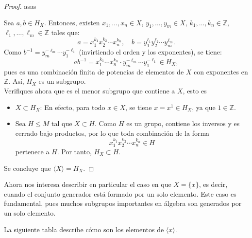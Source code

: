 \begin{proof}
	{\color{white}asas}
	
	\medskip
	\noindent [\(H_X\) es un subgrupo] Sea \( a, b \in H_X \). Entonces, existen \( x_1, \ldots, x_n \in X \), \( y_1, \ldots, y_m \in X \), \( k_1, \ldots, k_n \in \mathbb{Z} \), \( \ell_1, \ldots, \ell_m \in \mathbb{Z} \) tales que:
	\[
	a = x_1^{k_1} x_2^{k_2} \cdots x_n^{k_n}, \quad b = y_1^{\ell_1} y_2^{\ell_2} \cdots y_m^{\ell_m}.
	\]
	Como \( b^{-1} = y_m^{-\ell_m} \cdots y_1^{-\ell_1} \) (invirtiendo el orden y los exponentes), se tiene:
	\[
	ab^{-1} = x_1^{k_1} \cdots x_n^{k_n} \cdot y_m^{-\ell_m} \cdots y_1^{-\ell_1} \in H_X,
	\]
	pues es una combinación finita de potencias de elementos de \( X \) con exponentes en \( \mathbb{Z} \). Así, \( H_X \) es un subgrupo.\\
	

	\noindent[\(H_X = \langle X \rangle\)] Verifiques ahora que es el menor subgrupo que contiene a $X$, esto es 
	\begin{itemize}
		\item \( X \subset H_X \): En efecto, para todo \( x \in X \), se tiene \( x = x^1 \in H_X \), ya que \( 1 \in \mathbb{Z} \).
		
		\item Sea \( H \leq M \) tal que \( X \subset H \). Como \( H \) es un grupo, contiene los inversos y es cerrado bajo productos, por lo que toda combinación de la forma
		\[
		x_1^{k_1} x_2^{k_2} \cdots x_n^{k_n} \in H
		\]
		pertenece a \( H \). Por tanto, \( H_X \subset H \). 
	\end{itemize}
	Se concluye que \( \langle X \rangle = H_X \).
\end{proof}

\vspace{0.5cm}
Ahora nos interesa describir en particular el caso en que \( X = \{x\} \), es decir, cuando el conjunto generador está formado por un solo elemento. Este caso es fundamental, pues muchos subgrupos importantes en álgebra son generados por un solo elemento.

\begin{definicion}
\end{definicion}

\vspace{0.5cm}
 La siguiente tabla describe cómo son los elementos de $\langle x\rangle$.


